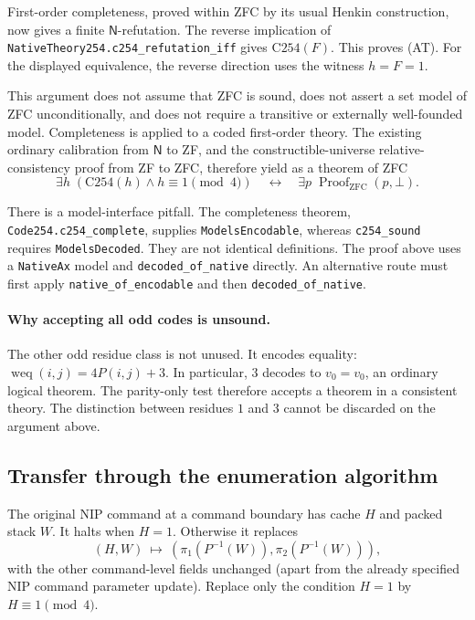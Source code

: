 First-order completeness, proved within ZFC by its usual Henkin construction,
now gives a finite $\mathsf{N}$-refutation.  The reverse implication of
\texttt{NativeTheory254.c254\_refutation\_iff} gives $\mathrm{C254}(F)$.
This proves (AT).  For the displayed equivalence, the reverse direction uses
the witness $h=F=1$.

This argument does not assume that ZFC is sound, does not assert a set model of
ZFC unconditionally, and does not require a transitive or externally
well-founded model.  Completeness is applied to a coded first-order theory.
The existing ordinary calibration from $\mathsf{N}$ to ZF, and the
constructible-universe relative-consistency proof from ZF to ZFC, therefore
yield as a theorem of ZFC
\[
 \exists h\;(\mathrm{C254}(h)\land h\equiv1\pmod4)
       \quad\longleftrightarrow\quad
       \exists p\;\operatorname{Proof}_{\mathrm{ZFC}}(p,\bot).
\]

There is a model-interface pitfall.  The completeness theorem,
\texttt{Code254.c254\_complete}, supplies \texttt{ModelsEncodable}, whereas
\texttt{c254\_sound} requires \texttt{ModelsDecoded}.  They are not identical
definitions.  The proof above uses a \texttt{NativeAx} model and
\texttt{decoded\_of\_native} directly.  An alternative route must first apply
\texttt{native\_of\_encodable} and then \texttt{decoded\_of\_native}.

\paragraph{Why accepting all odd codes is unsound.}
The other odd residue class is not unused.  It encodes equality:
$\operatorname{weq}(i,j)=4P(i,j)+3$.  In particular, $3$ decodes to
$v_0=v_0$, an ordinary logical theorem.  The parity-only test therefore accepts
a theorem in a consistent theory.  The distinction between residues $1$ and
$3$ cannot be discarded on the argument above.

\subsection{Transfer through the enumeration algorithm}

The original NIP command at a command boundary has cache $H$ and packed stack
$W$.  It halts when $H=1$.  Otherwise it replaces
\[
 (H,W)\ \longmapsto\ (\pi_1(P^{-1}(W)),\pi_2(P^{-1}(W))),
\]
with the other command-level fields unchanged (apart from the already
specified NIP command parameter update).  Replace only the condition $H=1$
by $H\equiv1\pmod4$.

